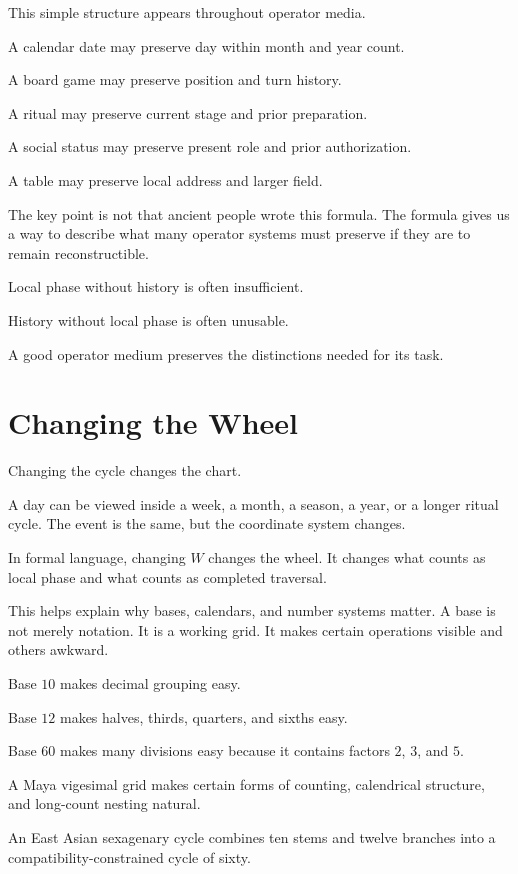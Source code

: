 \documentclass[11pt]{book}
\begin{document}
This simple structure appears throughout operator media.

A calendar date may preserve day within month and year count.

A board game may preserve position and turn history.

A ritual may preserve current stage and prior preparation.

A social status may preserve present role and prior authorization.

A table may preserve local address and larger field.

The key point is not that ancient people wrote this formula. The formula gives us a way to describe what many operator systems must preserve if they are to remain reconstructible.

Local phase without history is often insufficient.

History without local phase is often unusable.

A good operator medium preserves the distinctions needed for its task.

\section{Changing the Wheel}

Changing the cycle changes the chart.

A day can be viewed inside a week, a month, a season, a year, or a longer ritual cycle. The event is the same, but the coordinate system changes.

In formal language, changing \(W\) changes the wheel. It changes what counts as local phase and what counts as completed traversal.

This helps explain why bases, calendars, and number systems matter. A base is not merely notation. It is a working grid. It makes certain operations visible and others awkward.

Base \(10\) makes decimal grouping easy.

Base \(12\) makes halves, thirds, quarters, and sixths easy.

Base \(60\) makes many divisions easy because it contains factors \(2\), \(3\), and \(5\).

A Maya vigesimal grid makes certain forms of counting, calendrical structure, and long-count nesting natural.

An East Asian sexagenary cycle combines ten stems and twelve branches into a compatibility-constrained cycle of sixty.
\end{document}
